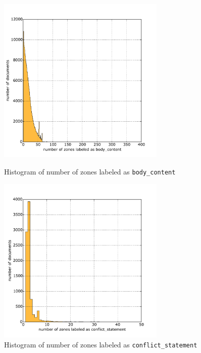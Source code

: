 \begin{appendix}
\begin{figure}
\centering
\begin{minipage}[t!]{0.48\linewidth}
  \includegraphics[width=8cm]{plots/body_content_histogram}
  \caption{Histogram of number of zones labeled as \texttt{body\_content}}
  \label{fig:body_content_histogram}
\end{minipage}
\quad
\begin{minipage}[t!]{0.48\linewidth}
  \includegraphics[width=8cm]{plots/conflict_statement_histogram}
  \caption{Histogram of number of zones labeled as \texttt{conflict\_statement}}
  \label{fig:conflict_statement_histogram}
\end{minipage}
\end{figure}


\end{appendix}
